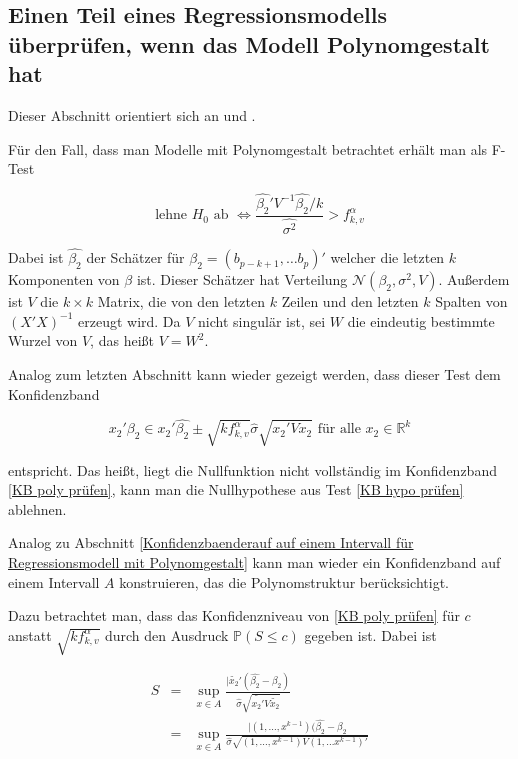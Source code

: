 \documentclass[12pt,a4paper]{article}
\theoremstyle{definition}
\theoremstyle{definition}
\theoremstyle{definition}
\theoremstyle{definition}
\begin{document}
\subsection{Einen Teil eines Regressionsmodells überprüfen, wenn das Modell Polynomgestalt hat}
\label{Teil eines Regressionsmodells überpruefen, wenn das Modell Polynomgestalt hat}
Dieser Abschnitt orientiert sich an \cite[190-192]{Liu64} und \cite{Draper98}.

Für den Fall, dass man Modelle mit Polynomgestalt betrachtet erhält man als F-Test

\begin{equation}\label{KB hypo prüfen}
\text{lehne } H_0 \text{ ab } \Leftrightarrow \frac{\hat{\beta_2}' V^{-1} \hat{\beta_2}/k}{\widehat{\sigma^2} }> f^{\alpha}_{k,v}
\end{equation}

Dabei ist $\hat{\beta_2}$ der Schätzer für $\beta_2=(b_{p-k+1}, \ldots b_{p})'$ welcher die letzten $k$ Komponenten von $\beta$ ist. Dieser Schätzer hat Verteilung $\mathscr{N}(\beta_2,\sigma^2,V)$. Außerdem ist $V$ die $k \times k$ Matrix, die von den letzten $k$ Zeilen und den letzten $k$ Spalten von $(X'X)^{-1}$ erzeugt wird. Da $V$ nicht singulär ist, sei $W$ die eindeutig bestimmte Wurzel von $V$, das heißt $V=W^2$. 

Analog zum letzten Abschnitt kann wieder gezeigt werden, dass dieser Test dem Konfidenzband 

\begin{equation}\label{KB poly prüfen}
x_2' \beta_2 \in x_2' \hat{\beta_2} \pm \sqrt{k f^{\alpha}_{k,v}} \hat{\sigma} \sqrt{x_2' V x_2} \text{ für alle } x_2 \in \mathbb{R}^k
\end{equation}

entspricht. Das heißt, liegt die Nullfunktion nicht vollständig im Konfidenzband \eqref{KB poly prüfen}, kann man die Nullhypothese aus Test \eqref{KB hypo prüfen} ablehnen.

Analog zu Abschnitt \ref{Konfidenzbaenderauf auf einem Intervall für Regressionsmodell mit Polynomgestalt} kann man wieder ein Konfidenzband auf einem Intervall $A$ konstruieren, das die Polynomstruktur berücksichtigt.

Dazu betrachtet man, dass das Konfidenzniveau von \eqref{KB poly prüfen} für $c$ anstatt $\sqrt{k f^{\alpha}_{k,v}}$ durch den Ausdruck $\mathbb{P}(S\leq c)$ gegeben ist. Dabei ist

\begin{eqnarray*}
S &=& \sup_{x \in A} \frac{\vert \tilde{x_2}' (\hat{\beta_2}-\beta_2)}{\hat{\sigma} \sqrt{\tilde{x_2'}V\tilde{x_2}}} \\
&=& \sup_{x \in A} \frac{\vert (1, \ldots, x^{k-1})(\hat{\beta_2}-\beta_2}{\hat{\sigma} \sqrt{(1, \ldots, x^{k-1}) V (1, \ldots x^{k-1})'}}
\end{eqnarray*}
\end{document}
